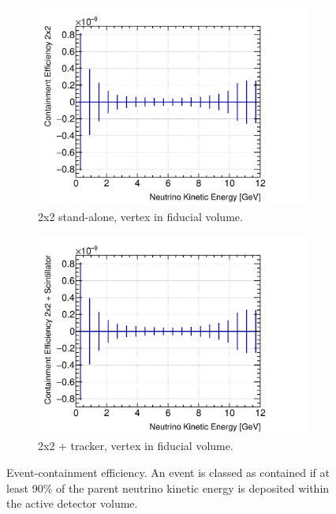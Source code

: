 \documentclass[10pt,a4paper,openany]{article}
\begin{document}
\begin{figure}[!htb]
\begin{subfigure}[b]{0.49\textwidth}
    \includegraphics[width=1.0\textwidth]{E_cont_eff_2x2_fiducial.png}
		\caption{2x2 stand-alone, vertex in fiducial volume.}
		\label{}
	\end{subfigure}	
	\hfill
	\begin{subfigure}[b]{0.49\textwidth}
		\centering
		\includegraphics[width=1.0\textwidth]{E_cont_eff_2x2_Scintillator_fiducial_gap.png}
		\caption{2x2 + tracker, vertex in fiducial volume.}
		\label{}
	\end{subfigure}
  \caption{Event-containment efficiency. An event is classed as contained if at least 90\% of the parent neutrino kinetic energy is deposited within the active detector volume.}
\end{figure}
\end{document}

